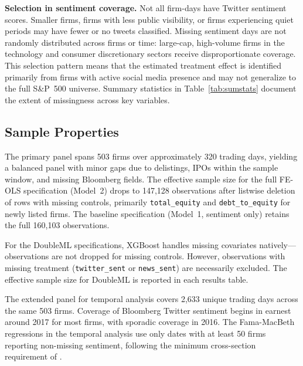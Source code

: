 \textbf{Selection in sentiment coverage.} Not all firm-days have Twitter sentiment scores.
Smaller firms, firms with less public visibility, or firms experiencing quiet periods may have
fewer or no tweets classified. Missing sentiment days are not randomly distributed across firms or
time: large-cap, high-volume firms in the technology and consumer discretionary sectors receive
disproportionate coverage. This selection pattern means that the estimated treatment effect is
identified primarily from firms with active social media presence and may not generalize to the
full S\&P~500 universe. Summary statistics in Table~\ref{tab:sumstats} document the extent of
missingness across key variables.

\subsection{Sample Properties}
\label{sec:data_sample}

The primary panel spans 503 firms over approximately 320 trading days, yielding a balanced panel
with minor gaps due to delistings, IPOs within the sample window, and missing Bloomberg fields.
The effective sample size for the full FE-OLS specification (Model~2) drops to 147,128
observations after listwise deletion of rows with missing controls, primarily
\texttt{total\_equity} and \texttt{debt\_to\_equity} for newly listed firms. The baseline
specification (Model~1, sentiment only) retains the full 160,103 observations.

For the DoubleML specifications, XGBoost handles missing covariates natively---observations are
not dropped for missing controls. However, observations with missing treatment
(\texttt{twitter\_sent} or \texttt{news\_sent}) are necessarily excluded. The effective sample
size for DoubleML is reported in each results table.

The extended panel for temporal analysis covers 2,633 unique trading days across the same 503
firms. Coverage of Bloomberg Twitter sentiment begins in earnest around 2017 for most firms,
with sporadic coverage in 2016. The Fama-MacBeth regressions in the temporal analysis use only
dates with at least 50 firms reporting non-missing sentiment, following the minimum
cross-section requirement of \citet{gu2020}.

% 


